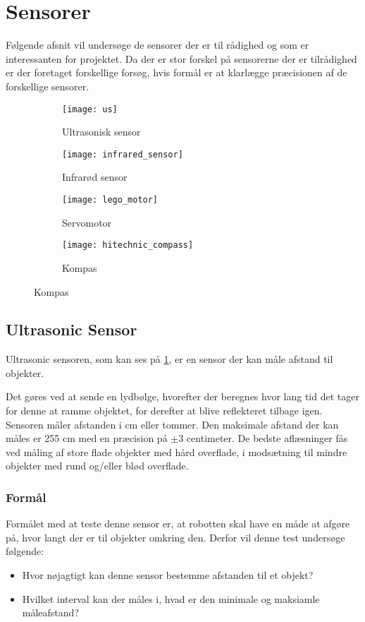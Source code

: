 \section{Sensorer}
Følgende afsnit vil undersøge de sensorer der er til rådighed og som er interessanten for projektet.
Da der er stor forskel på sensorerne der er tilrådighed er der foretaget forskellige forsøg, hvis formål er at klarlægge præcisionen af de forskellige sensorer.

\begin{figure}[h]
\centering
\begin{subfigure}[b]{.4\textwidth}
\centering
\texttt{[image: us]}
\caption{Ultrasonisk sensor}
\label{sensor:ultrasonic_sensor}
\end{subfigure}
\begin{subfigure}[b]{.4\textwidth}
\centering
\texttt{[image: infrared\_sensor]}
\caption{Infrarød sensor}
\label{sensor:infraroed_sensor}
\end{subfigure}
\begin{subfigure}[b]{.4\textwidth}
\centering
\texttt{[image: lego\_motor]}
\caption{Servomotor}
\label{sensor:servo_motor}
\end{subfigure}
\begin{subfigure}[b]{.4\textwidth}
\centering
\texttt{[image: hitechnic\_compass]}
\caption{Kompas}
\label{sensor:compass}
\end{subfigure}
\end{figure}


\subsection{Ultrasonic Sensor}
Ultrasonic sensoren, som kan ses på \cref{sensor:ultrasonic_sensor}, er en sensor der kan måle afstand til objekter.

Det gøres ved at sende en lydbølge, hvorefter der beregnes hvor lang tid det tager for denne at ramme objektet, for derefter at blive reflekteret tilbage igen.
Sensoren måler afstanden i cm eller tommer.
Den maksimale afstand der kan måles er 255 cm med en præcision på $\pm$3 centimeter.
De bedste aflæsninger fås ved måling af store flade objekter med hård overflade, i modsætning til mindre objekter med rund og/eller blød overflade.\cite{nxt}

\subsubsection{Formål}
Formålet med at teste denne sensor er, at robotten skal have en måde at afgøre på, hvor langt der er til objekter omkring den.
Derfor vil denne test undersøge følgende:
\begin{itemize}
\item Hvor nøjagtigt kan denne sensor bestemme afstanden til et objekt?
\item Hvilket interval kan der måles i, hvad er den minimale og maksiamle måleafstand?
\end{itemize}

